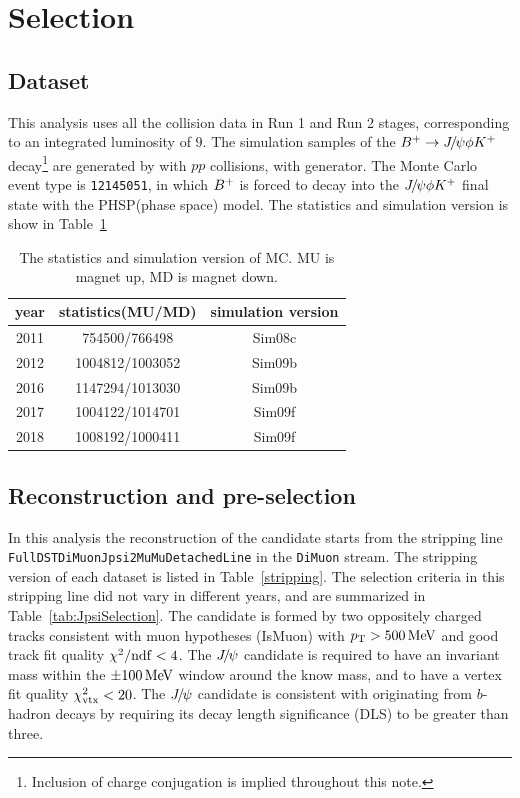 %
\section{Selection}

\subsection{Dataset}
This analysis uses all the \pp collision data in Run 1 and  Run 2 stages, corresponding to an integrated luminosity of 9\invfb. 
The simulation samples of the ${{{B}^+}}\rightarrow{\ensuremath{{J\mskip -3mu/\mskip -2mu\psi}}}\phi{\ensuremath{{K}^+}}$ decay{\footnote{Inclusion of charge conjugation is implied throughout this note.}} are generated by \pythia
with $pp$ collisions, with  generator.
The Monte Carlo event type is \texttt{12145051}, in which ${{{B}^+}}$ is forced to decay into the ${{J\mskip -3mu/\mskip -2mu\psi}}\phi{\ensuremath{{K}^+}}$ final state with the PHSP(phase space) model. The statistics and simulation version is show in Table~\ref{table:MC}
 
\begin{table}[h]
\centering
\caption{The statistics and simulation version of MC. MU is magnet up, MD is magnet down.}\label{table:MC}
\begin{tabular}{ccc}
\hline
year & statistics(MU/MD) & simulation version\\
\hline \hline
2011 &      754500/766498         & Sim08c     \\
2012 &      1004812/1003052       & Sim09b     \\
2016 &      1147294/1013030       & Sim09b     \\
2017 &      1004122/1014701       & Sim09f     \\
2018 &      1008192/1000411       & Sim09f     \\
\hline
\end{tabular}
\normalsize

\end{table}   
%
\subsection{Reconstruction and pre-selection}
In this analysis the reconstruction of the \Bp candidate starts
from the stripping line \texttt{FullDSTDiMuonJpsi2MuMuDetachedLine} in the \texttt{DiMuon} stream. The stripping version of each dataset is listed in Table~\ref{stripping}. 
The selection criteria in this stripping line did not vary in different years, and are summarized in Table~\ref{tab:JpsiSelection}.
The \jpsi candidate is formed by two oppositely charged tracks consistent with muon hypotheses (IsMuon) with $p_{\mathrm{T}}>500\text{\,Me\kern -0.1em V}$ and good track fit quality $\chi^2/\mathrm{ndf}<4$. 
The ${{J\mskip -3mu/\mskip -2mu\psi}}$ candidate is required to have an invariant mass within the $\pm100\text{\,Me\kern -0.1em V}$ window around the know \jpsi mass\supercite{PDG}, and to have a vertex fit quality $\chi^2_{\text{vtx}}<20$. 
The ${{J\mskip -3mu/\mskip -2mu\psi}}$ candidate is consistent with originating from $b$-hadron decays by requiring its decay length significance (DLS) to be greater than three. 


